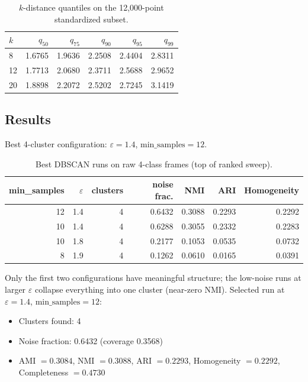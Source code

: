 \documentclass[11pt]{article}
\begin{document}
\begin{table}[H]
\centering
\caption{$k$-distance quantiles on the 12{,}000-point standardized subset.}
\begin{tabular}{lrrrrr}
\toprule
$k$ & $q_{50}$ & $q_{75}$ & $q_{90}$ & $q_{95}$ & $q_{99}$ \\
\midrule
 8 & 1.6765 & 1.9636 & 2.2508 & 2.4404 & 2.8311 \\
12 & 1.7713 & 2.0680 & 2.3711 & 2.5688 & 2.9652 \\
20 & 1.8898 & 2.2072 & 2.5202 & 2.7245 & 3.1419 \\
\bottomrule
\end{tabular}
\end{table}

\subsection*{Results}

Best 4-cluster configuration: $\varepsilon = 1.4$, $\text{min\_samples} = 12$.

\begin{table}[H]
\centering
\caption{Best DBSCAN runs on raw 4-class frames (top of ranked sweep).}
\begin{tabular}{rrrrrrr}
\toprule
min\_samples & $\varepsilon$ & clusters & noise frac. & NMI & ARI & Homogeneity \\
\midrule
12 & 1.4 & 4 & 0.6432 & 0.3088 & 0.2293 & 0.2292 \\
10 & 1.4 & 4 & 0.6288 & 0.3055 & 0.2332 & 0.2283 \\
10 & 1.8 & 4 & 0.2177 & 0.1053 & 0.0535 & 0.0732 \\
 8 & 1.9 & 4 & 0.1262 & 0.0610 & 0.0165 & 0.0391 \\
\bottomrule
\end{tabular}
\end{table}

Only the first two configurations have meaningful structure; the low-noise runs at larger $\varepsilon$ collapse everything into one cluster (near-zero NMI). Selected run at $\varepsilon = 1.4$, $\text{min\_samples} = 12$:

\begin{itemize}
\item Clusters found: 4
\item Noise fraction: 0.6432 (coverage 0.3568)
\item AMI $= 0.3084$, NMI $= 0.3088$, ARI $= 0.2293$, Homogeneity $= 0.2292$, Completeness $= 0.4730$
\end{itemize}
\end{document}

